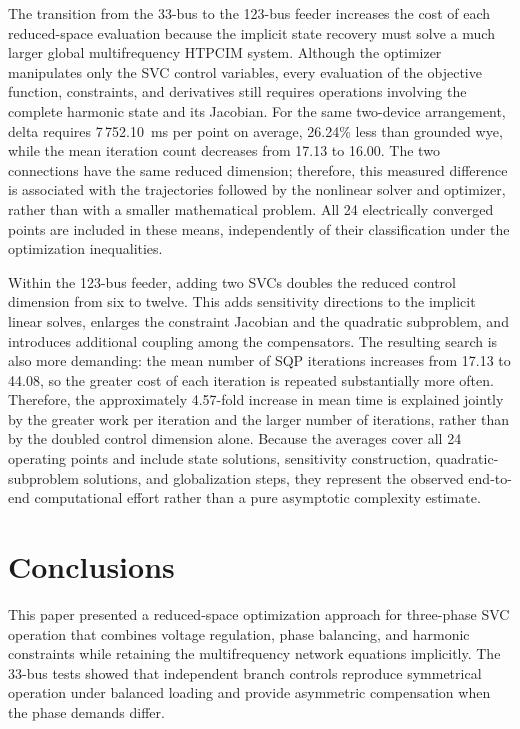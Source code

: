 \documentclass[journal]{IEEEtran}
\begin{document}
The transition from the 33-bus to the 123-bus feeder increases the cost of each
reduced-space evaluation because the implicit state recovery must solve a much
larger global multifrequency HTPCIM system. Although the optimizer manipulates
only the SVC control variables, every evaluation of the objective function,
constraints, and derivatives still requires operations involving the complete
harmonic state and its Jacobian. For the same two-device arrangement, delta
requires 7\,752.10~ms per point on average, 26.24\% less than grounded wye,
while the mean iteration count decreases from 17.13 to 16.00. The two
connections have the same reduced dimension; therefore, this measured
difference is associated with the trajectories followed by the nonlinear
solver and optimizer, rather than with a smaller mathematical problem. All 24
electrically converged points are included in these means, independently of
their classification under the optimization inequalities.

Within the 123-bus feeder, adding two SVCs
doubles the reduced control dimension from six to twelve. This adds sensitivity
directions to the implicit linear solves, enlarges the constraint Jacobian and
the quadratic subproblem, and introduces additional coupling among the
compensators. The resulting search is also more demanding: the mean number of
SQP iterations increases from 17.13 to 44.08, so the greater cost of each
iteration is repeated substantially more often. Therefore, the approximately
4.57-fold increase in mean time is explained jointly by the greater work per
iteration and the larger number of iterations, rather than by the doubled
control dimension alone. Because the averages cover all 24 operating points
and include state solutions, sensitivity construction, quadratic-subproblem
solutions, and globalization steps, they represent the observed end-to-end
computational effort rather than a pure asymptotic complexity estimate.

\color{black}

\section{Conclusions}
\label{sec:conclusions}

This paper presented a reduced-space optimization approach for three-phase
SVC operation that combines voltage regulation, phase balancing, and harmonic
constraints while retaining the multifrequency network equations implicitly.
The 33-bus tests showed that independent branch controls reproduce symmetrical
operation under balanced loading and provide asymmetric compensation when the
phase demands differ.
\end{document}

